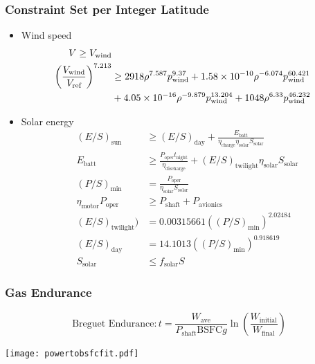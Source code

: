 \documentclass{beamer}
\begin{document}
\begin{frame}
    \frametitle{Constraint Set per Integer Latitude}
    
    \scriptsize
    \begin{itemize}
        \item Wind speed
        \begin{align*}
        V \geq V_{\text{wind}} \\
        \left(\frac{V_{\text{wind}}}{V_{\text{ref}}}\right)^{7.213} &\geq 2918\rho^{7.587}p_{\text{wind}}^{9.37} + \num{1.58d-10}\rho^{-6.074}p_{\text{wind}}^{60.421} \\
                                                                    &+ \num{4.05d-16}\rho^{-9.879}p_{\text{wind}}^{13.204} + 1048\rho^{6.33}p_{\text{wind}}^{46.232} 
\end{align*}
    
        \item Solar energy
        \begin{align*}
        (E/S)_{\text{sun}}  &\geq (E/S)_{\text{day}} + \frac{E_{\text{batt}}}{\eta_{\text{charge}}\eta_{\text{solar}} S_{\text{solar}}} \\
    E_{\text{batt}} &\geq \frac{P_{\text{oper}}t_{\text{night}}}{\eta_{\text{discharge}}} + (E/S)_{\text{twilight}} \eta_{\text{solar}} S_{\text{solar}} \\
    (P/S)_{\text{min}} &= \frac{P_{\text{oper}}}{\eta_{\text{solar}} S_{\text{solar}}} \\
    \eta_{\text{motor}} P_{\text{oper}} &\geq P_{\text{shaft}} + P_{\text{avionics}}\\
            (E/S)_{\text{twilight}}) &= 0.00315661 ((P/S)_{\text{min}})^{2.02484} \\
            (E/S)_{\text{day}} &= 14.1013((P/S)_{\text{min}})^{0.918619} \\
            S_{\text{solar}} & \leq f_{\text{solar}}S
        \end{align*}
    \end{itemize}

\end{frame}

\begin{frame}
    \frametitle{Gas Endurance}

    \[ \text{Breguet Endurance}: t = \frac{W_{\text{ave}}}{P_{\text{shaft}}\text{BSFC}g} \ln{\left( \frac{W_{\text{initial}}}{W_{\text{final}}}\right)} \]
        
    \begin{center}
    \texttt{[image: powertobsfcfit.pdf]}
    \end{center}

\end{frame}
        
\end{document}
